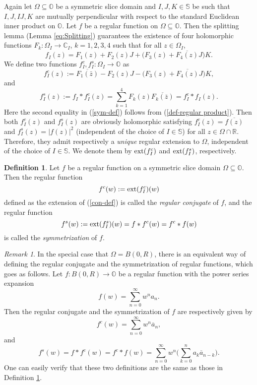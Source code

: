 \documentclass{amsart}
\theoremstyle{definition}
\newtheorem{definition}[theorem]{Definition}
\theoremstyle{remark}
\newtheorem{remark}[theorem]{Remark}
\numberwithin{equation}{section}
\begin{document}
Again let $\Omega\subseteq \mathbb O$ be a symmetric slice domain and $I, J, K\in\mathbb S$ be such that  $I, J, IJ, K$ are mutually perpendicular with respect to the standard Euclidean inner product on $\mathbb O$. Let $f$ be a regular function on   $\Omega\subseteq \mathbb O$. Then the splitting lemma (Lemma \ref{eq:Splitting}) guarantees the existence of four holomorphic functions $F_k: \Omega_I\rightarrow \mathbb C_I$, $k=1,2,3,4$ such that for all $z\in\Omega_I$,
\begin{equation*}\label{splitting of f}
f_I(z)=F_1(z)+F_2(z)J+\big(F_3(z)+\overline{F_4(z)}J\big)K.
\end{equation*}
We define two functions $f^c_I, f^s_I:\Omega_I\rightarrow \mathbb O$ as
\begin{equation}\label{con-def}
 f^c_I(z):=\overline{F_1(\bar{z})}-F_2(z)J-\big(F_3(z)+\overline{F_4(z)}J\big)K,
\end{equation}
and
\begin{equation}\label{sym-def}
f^s_I(z):= f_I\ast f^c_I(z)
=\sum_{k=1}^{4}F_k(z)\overline{F_k(\bar{z})}= f^c_I\ast f_I(z).
\end{equation}
Here the second equality in (\ref{sym-def}) follows from (\ref{def-regular product}).
Then both $f^c_I(z)$ and $f^s_I(z)$ are obviously holomorphic satisfying $f^c_I(z)=\overline{f(z)}$ and $f^s_I(z)=|f(z)|^2$ (independent of the choice of $I\in\mathbb S$) for all $z\in\Omega\cap\mathbb R$. Therefore, they  admit respectively a \textit{unique} regular extension to $\Omega$, independent of the choice of $I\in\mathbb S$. We denote them  by ${\rm{ext}}(f^c_I)$ and ${\rm{ext}}(f^s_I)$, respectively.

\begin{definition}\label{con-sym-def}
Let $f$  be a regular function on  a symmetric slice domain $\Omega\subseteq \mathbb O$. Then the regular function
$$f^c(w):={\rm{ext}}(f^c_I)(w)$$
defined as the extension of (\ref{con-def}) is called the \textit{regular conjugate} of $f$, and the regular function
$$f^s(w):={\rm{ext}}(f^s_I)(w)=f\ast f^c(w)=f^c\ast f(w)$$
is called the \textit{symmetrization} of $f$.
\end{definition}

\begin{remark}\label{remark on con-sym01}
In the special case that $\Omega=B(0,R)$, there is an equivalent way of defining the regular conjugate and the symmetrization of regular functions, which goes as follows.
Let $f:B(0,R)\rightarrow \mathbb O$ be a regular function with the  power series expansion
\begin{equation*}\label{equi-def}
f(w)=\sum\limits_{n=0}^{\infty}w^na_n.
\end{equation*}
Then the regular conjugate and the symmetrization of $f$ are respectively given by
$$f^c(w)=\sum\limits_{n=0}^{\infty}w^n\overline{a}_n,$$
and
$$f^s(w)=f\ast f^c(w)=f^c\ast f(w)=\sum\limits_{n=0}^{\infty}w^n\bigg(\sum\limits_{k=0}^n a_k\overline{a}_{n-k}\bigg).$$
One can easily verify that these two definitions are the same as those in Definition \ref{con-sym-def}.
\end{remark}
\end{document}
